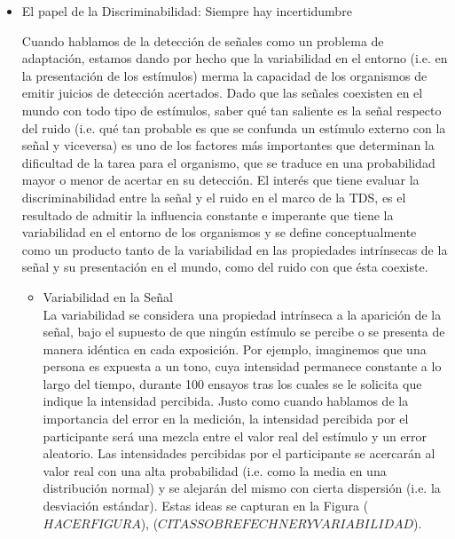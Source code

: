 \begin{itemize}
  \item{El papel de la Discriminabilidad: Siempre hay incertidumbre}

Cuando hablamos de la detección de señales como un problema de adaptación, estamos dando por hecho que la variabilidad en el entorno (i.e. en la presentación de los estímulos) merma la capacidad de los organismos de emitir juicios de detección acertados. Dado que las señales coexisten en el mundo con todo tipo de estímulos, saber qué tan saliente es la señal respecto del ruido (i.e. qué tan probable es que se confunda un estímulo externo con la señal y viceversa) es uno de los factores más importantes que determinan la dificultad de la tarea para el organismo, que se traduce en una probabilidad mayor o menor de acertar en su detección. El interés que tiene evaluar la discriminabilidad entre la señal y el ruido en el marco de la TDS, es el resultado de admitir la influencia constante e imperante que tiene la variabilidad en el entorno de los organismos y se define conceptualmente como un producto tanto de la variabilidad en las propiedades intrínsecas de la señal y su presentación en el mundo, como del ruido con que ésta coexiste.\\

    \begin{itemize}
      \item{Variabilidad en la Señal}\\

La variabilidad se considera una propiedad intrínseca a la aparición de la señal, bajo el supuesto de que ningún estímulo se percibe o se presenta de manera idéntica en cada exposición. Por ejemplo, imaginemos que una persona es expuesta a un tono, cuya intensidad permanece constante a lo largo del tiempo, durante 100 ensayos tras los cuales se le solicita que indique la intensidad percibida. Justo como cuando hablamos de la importancia del error en la medición, la intensidad percibida por el participante será una mezcla entre el valor real del estímulo y un error aleatorio. Las intensidades percibidas por el participante se acercarán al valor real con una alta probabilidad (i.e. como la media en una distribución normal) y se alejarán del mismo con cierta dispersión (i.e. la desviación estándar). Estas ideas se capturan en la Figura ($HACER FIGURA$), ($CITAS SOBRE FECHNER Y VARIABILIDAD$).\\


\end{itemize}
\end{itemize}
